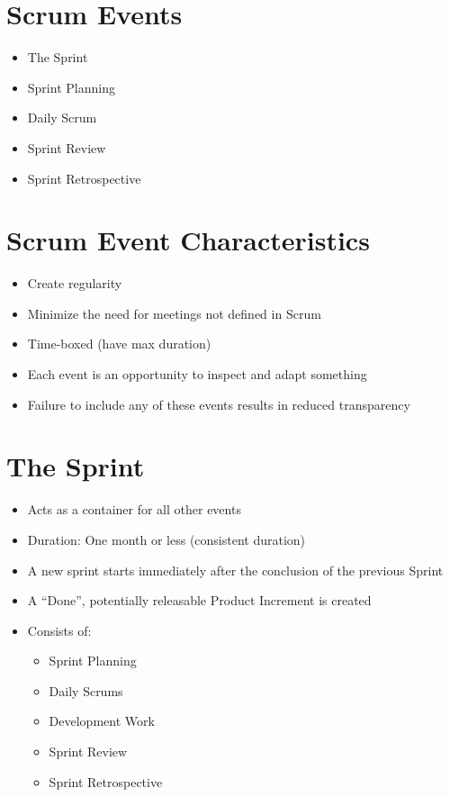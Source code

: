 \documentclass[a4paper,11pt,twocolumn]{article}
\begin{document}
\section*{Scrum Events}
\begin{itemize}
    \item The Sprint
	\item Sprint Planning
	\item Daily Scrum
	\item Sprint Review
	\item Sprint Retrospective
\end{itemize}

\section*{Scrum Event Characteristics}
\begin{itemize}
    \item Create regularity
	\item Minimize the need for meetings not defined in Scrum
	\item Time-boxed (have max duration)
	\item Each event is an opportunity to inspect and adapt something
	\item Failure to include any of these events results in reduced transparency
\end{itemize}

\section*{The Sprint}
\begin{itemize}
    \item Acts as a container for all other events
	\item Duration: One month or less (consistent duration)
	\item A new sprint starts immediately after the conclusion of the previous Sprint
	\item A ``Done'', potentially releasable Product Increment is created
	\item Consists of:
	\vspace{-0.5em}
    \begin{itemize}
        \setlength\itemsep{0em}
        \item Sprint Planning
        \item Daily Scrums
        \item Development Work
        \item Sprint Review
        \item Sprint Retrospective
    \end{itemize}
\end{itemize}
\end{document}
